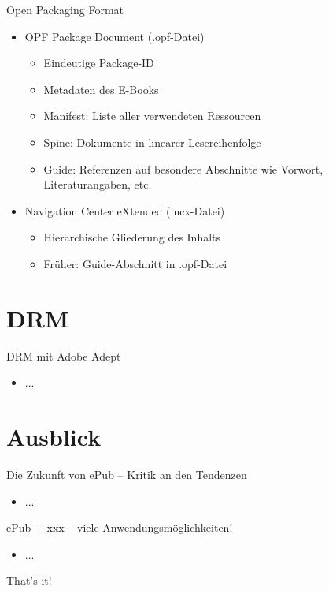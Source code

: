 \documentclass[hyperref={pdfpagelabels=false}]{beamer}
\begin{document}
\begin{frame}{Open Packaging Format}
	\begin{itemize}
		\item OPF Package Document (.opf-Datei)
		\begin{itemize}
			\item Eindeutige Package-ID
			\item Metadaten des E-Books
			\item Manifest: Liste aller verwendeten Ressourcen
			\item Spine: Dokumente in linearer Lesereihenfolge
			\item Guide: Referenzen auf besondere Abschnitte wie Vorwort, Literaturangaben, etc.
		\end{itemize}
		\item Navigation Center eXtended (.ncx-Datei)
		\begin{itemize}
			\item Hierarchische Gliederung des Inhalts
			\item Früher: Guide-Abschnitt in .opf-Datei
		\end{itemize}
	\end{itemize}
\end{frame}



\section{DRM}

\begin{frame}{DRM mit Adobe Adept}
	\begin{itemize}
		\item ...
	\end{itemize}
\end{frame}


\section{Ausblick}

\begin{frame}{Die Zukunft von ePub -- Kritik an den Tendenzen}
	\begin{itemize}
		\item ...
	\end{itemize}
\end{frame}

\begin{frame}{ePub + xxx -- viele Anwendungsmöglichkeiten!}
	\begin{itemize}
		\item ...
	\end{itemize}
\end{frame}


\begin{frame}[plain]
	That's it!
	\begin{center}
	\end{center}
\end{frame}


\end{document}
